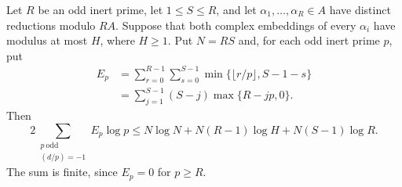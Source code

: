 \begin{proposition}\label{sz-finite}
Let $R$ be an odd inert prime, let $1\le S\le R$, and let
$\alpha_1,\ldots,\alpha_R\in A$ have distinct reductions modulo $RA$.
Suppose that both complex embeddings of every $\alpha_i$ have modulus
at most $H$, where $H\ge1$. Put $N=RS$ and, for each odd inert prime $p$, put
\begin{align}
 E_p&=\sum_{r=0}^{R-1}\sum_{s=0}^{S-1}
        \min\{\lfloor r/p\rfloor,S-1-s\}\label{sz-E}\\
    &=\sum_{j=1}^{S-1}(S-j)\max\{R-jp,0\}.\nonumber
\end{align}
Then
\begin{equation}\label{sz-finite-ineq}
 2\sum_{\substack{p\ \mathrm{odd}\\ (d/p)=-1}} E_p\log p
 \le N\log N+N(R-1)\log H+N(S-1)\log R.
\end{equation}
The sum is finite, since $E_p=0$ for $p\ge R$.
\end{proposition}
